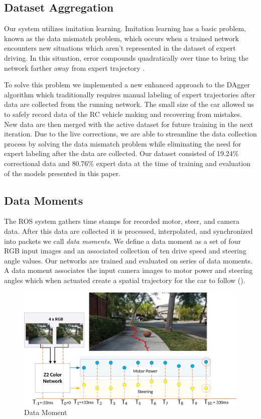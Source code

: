 \subsection{Dataset Aggregation}
Our system utilizes imitation learning. Imitation learning has a basic problem, known as the data mismatch problem, which occurs when a trained network encounters new situations which aren't represented in the dataset of expert driving. In this situation, error compounds quadratically over time to bring the network farther away from expert trajectory \cite{ross2010efficient}.

To solve this problem we implemented a new enhanced approach to the DAgger algorithm \cite{ross2011reduction} which traditionally requires manual labeling of expert trajectories after data are collected from the running network. The small size of the car allowed us to safely record data of the RC vehicle making and recovering from mistakes. New data are then merged with the active dataset for future training in the next iteration. Due to the live corrections, we are able to streamline the data collection process by solving the data mismatch problem while eliminating the need for expert labeling after the data are collected. Our dataset consisted of 19.24\% correctional data and 80.76\% expert data at the time of training and evaluation of the models presented in this paper.

\subsection{Data Moments}

The ROS system gathers time stamps for recorded motor, steer, and camera data. After this data are collected it is processed, interpolated, and synchronized into packets we call \textit{data moments}. We define a data moment as a set of four RGB input images and an associated collection of ten drive speed and steering angle values. Our networks are trained and evaluated on   series of data moments. A data moment associates the input camera images to motor power and steering angles which when actuated create a spatial trajectory for the car to follow (). 

\begin{figure}
\centering
\includegraphics[width=\columnwidth]{paper/content/images/data_moment}
\caption{Data Moment}
\label{fig:moment}
\end{figure}

